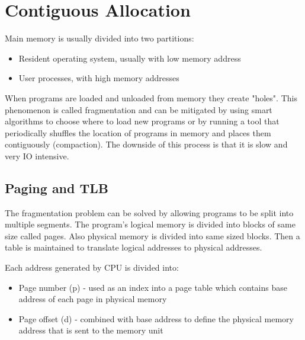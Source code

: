 
\section{Contiguous Allocation}
Main memory is usually divided into two partitions:
\begin{itemize}
    \item Resident operating system, usually with low memory address
    \item User processes, with high memory addresses
\end{itemize}
When programs are loaded and unloaded from memory they create "holes". This phenomenon is called fragmentation and can be mitigated by using smart algorithms to choose where to load new programs or by running a tool that periodically shuffles the location of programs in memory and places them contiguously (compaction). The downside of this process is that it is slow and very IO intensive.


\subsection{Paging and TLB}
The fragmentation problem can be solved by allowing programs to be split into multiple segments. The program's logical memory is divided into blocks of same size called pages. Also physical memory is divided into same sized blocks. Then a table is maintained to translate logical addresses to physical addresses.


Each address generated by CPU is divided into:
\begin{itemize}
    \item Page number (p) - used as an index into a page table which contains base address of each page in physical memory
    \item Page offset (d) - combined with base address to define the physical memory address that is sent to the memory unit
\end{itemize}


